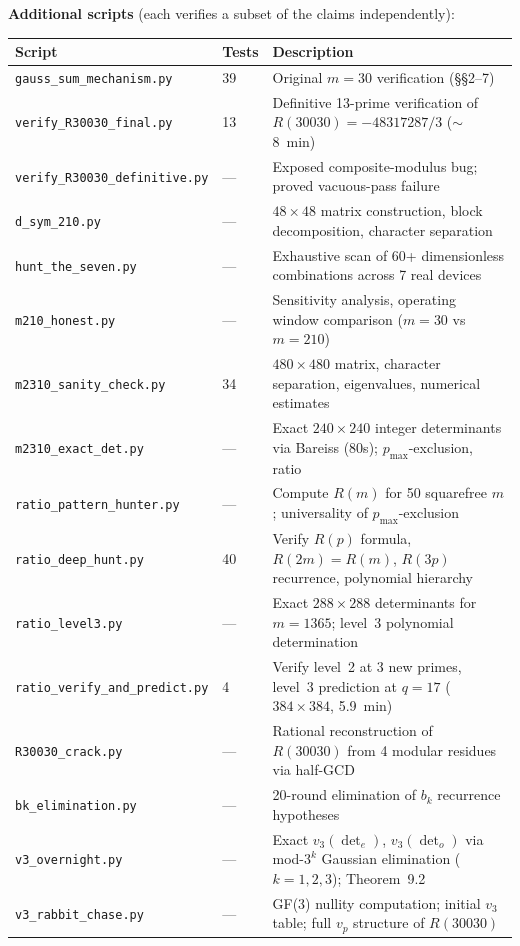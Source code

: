 \documentclass[11pt,letterpaper]{article}
\theoremstyle{definition}
\begin{document}
\medskip
\textbf{Additional scripts} (each verifies a subset of the claims independently):

{\small
\begin{center}
\begin{tabular}{@{}llp{}@{}}
\toprule
Script & Tests & Description \\
\midrule
\texttt{gauss\_sum\_mechanism.py}      & 39 & Original $m = 30$ verification (\S\S2--7) \\
\texttt{verify\_R30030\_final.py}      & 13 & Definitive 13-prime verification of $R(30030) = -48317287/3$ ($\sim$8~min) \\
\texttt{verify\_R30030\_definitive.py} & --- & Exposed composite-modulus bug; proved vacuous-pass failure \\
\texttt{d\_sym\_210.py}                & --- & $48 \times 48$ matrix construction, block decomposition, character separation \\
\texttt{hunt\_the\_seven.py}           & --- & Exhaustive scan of 60+ dimensionless combinations across 7 real devices \\
\texttt{m210\_honest.py}               & --- & Sensitivity analysis, operating window comparison ($m = 30$ vs $m = 210$) \\
\texttt{m2310\_sanity\_check.py}       & 34 & $480 \times 480$ matrix, character separation, eigenvalues, numerical estimates \\
\texttt{m2310\_exact\_det.py}          & --- & Exact $240 \times 240$ integer determinants via Bareiss (80s); $p_{\text{max}}$-exclusion, ratio \\
\texttt{ratio\_pattern\_hunter.py}     & --- & Compute $R(m)$ for 50 squarefree $m$; universality of $p_{\text{max}}$-exclusion \\
\texttt{ratio\_deep\_hunt.py}          & 40 & Verify $R(p)$ formula, $R(2m)=R(m)$, $R(3p)$ recurrence, polynomial hierarchy \\
\texttt{ratio\_level3.py}              & --- & Exact $288 \times 288$ determinants for $m=1365$; level~3 polynomial determination \\
\texttt{ratio\_verify\_and\_predict.py} & 4  & Verify level~2 at 3 new primes, level~3 prediction at $q=17$ ($384 \times 384$, 5.9~min) \\
\texttt{R30030\_crack.py}              & --- & Rational reconstruction of $R(30030)$ from 4 modular residues via half-GCD \\
\texttt{bk\_elimination.py}            & --- & 20-round elimination of $b_k$ recurrence hypotheses \\
\texttt{v3\_overnight.py}              & --- & Exact $v_3(\det_e)$, $v_3(\det_o)$ via mod-$3^k$ Gaussian elimination ($k = 1, 2, 3$); Theorem~9.2 \\
\texttt{v3\_rabbit\_chase.py}          & --- & GF(3) nullity computation; initial $v_3$ table; full $v_p$ structure of $R(30030)$ \\
\bottomrule
\end{tabular}
\end{center}
}
\end{document}
